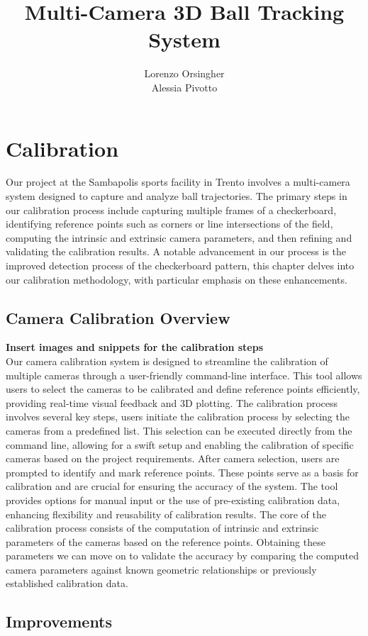 \documentclass{template}
\title{Multi-Camera 3D Ball Tracking System}
\author{Lorenzo Orsingher\\Alessia Pivotto}
\begin{document}
\chapter{Calibration}\label{ch:in}
Our project at the Sambapolis sports facility in Trento involves a multi-camera system designed to capture and analyze ball trajectories. 
The primary steps in our calibration process include capturing multiple frames of a checkerboard, identifying reference points such as corners or line intersections of the field, computing the intrinsic and extrinsic camera parameters, and then refining and validating the calibration results.
A notable advancement in our process is the improved detection process of the checkerboard pattern, this chapter delves into our calibration methodology, with particular emphasis on these enhancements.

\section{Camera Calibration Overview}
\textbf{Insert images and snippets for the calibration steps}\\
Our camera calibration system is designed to streamline the calibration of multiple cameras through a user-friendly command-line interface. 
This tool allows users to select the cameras to be calibrated and define reference points efficiently, providing real-time visual feedback and 3D plotting. 
The calibration process involves several key steps, users initiate the calibration process by selecting the cameras from a predefined list. 
This selection can be executed directly from the command line, allowing for a swift setup and enabling the calibration of specific cameras based on the project requirements. 
After camera selection, users are prompted to identify and mark reference points. 
These points serve as a basis for calibration and are crucial for ensuring the accuracy of the system. 
The tool provides options for manual input or the use of pre-existing calibration data, enhancing flexibility and reusability of calibration results.
The core of the calibration process consists of the computation of intrinsic and extrinsic parameters of the cameras based on the reference points. 
Obtaining these parameters we can move on to validate the accuracy by comparing the computed camera parameters against known geometric relationships or previously established calibration data. 

\section{Improvements}
\end{document}

